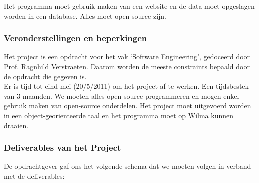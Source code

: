 \documentclass{article}
\begin{document}
Het programma moet gebruik maken van een website en de data moet opgeslagen worden in een database. Alles moet open-source zijn.


\subsubsection{Veronderstellingen en beperkingen}


Het project is een opdracht voor het vak `Software Engineering', gedoceerd door Prof. Ragnhild Verstraeten. Daarom worden de meeste constraints bepaald door de opdracht die gegeven is. \\
Er is tijd tot eind mei (20/5/2011) om het project af te werken. Een tijdsbestek van 3 maanden. We moeten alles open source programmeren en mogen enkel gebruik maken van open-source onderdelen. Het project moet uitgevoerd worden in een object-georienteerde taal en het programma moet op Wilma kunnen draaien.\\


\subsubsection{Deliverables van het Project}


De opdrachtgever gaf ons het volgende schema dat we moeten volgen in verband met de deliverables:
	
\end{document}
